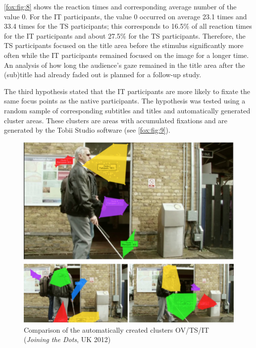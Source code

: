 \documentclass[output=paper]{langsci/langscibook}
\begin{document}
\autoref{fox:fig:8} shows the reaction times and corresponding average number of the value 0. For the IT participants, the value 0 occurred on average 23.1 times and 33.4 times for the TS participants; this corresponds to 16.5\% of all reaction times for the IT participants and about 27.5\% for the TS participants. Therefore, the TS participants focused on the title area before the stimulus significantly more often while the IT participants remained focused on the image for a longer time. An analysis of how long the audience's gaze remained in the title area after the (sub)title had already faded out is planned for a follow-up study.



The third hypothesis stated that the IT participants are more likely to fixate the same focus points as the native participants. The hypothesis was tested using a random sample of corresponding subtitles and titles and automatically generated cluster areas. These clusters are areas with accumulated fixations and are generated by the Tobii Studio software (see \autoref{fox:fig:9}).


\begin{figure} 
  \includegraphics[height=.3\textheight]{figures/Fox9.png}
  \caption{Comparison of the automatically created clusters OV/TS/IT (\textit{Joining the Dots}, UK 2012)}
  \label{fox:fig:9}
\end{figure}
\end{document}
